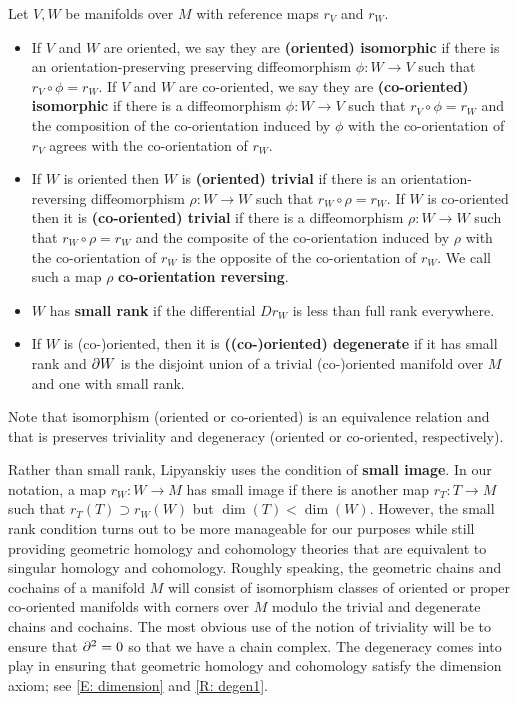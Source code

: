 \begin{definition}\label{D: equiv triv and small}
 Let $V, W$ be manifolds over $M$ with reference maps $r_V$ and $r_W$.
	\begin{itemize}
		\item If $V$ and $W$ are oriented, we say they are \textbf{(oriented) isomorphic} if there is an orientation-preserving preserving diffeomorphism $\phi \colon W \to V$ such that $r_V \circ \phi = r_W$. If $V$ and $W$ are co-oriented, we say they are \textbf{(co-oriented) isomorphic} if there is a diffeomorphism $\phi \colon W \to V$ such that $r_V \circ \phi = r_W$ and the composition of the
co-orientation induced by $\phi$
with the co-orientation of $r_V$ agrees with the co-orientation of $r_W$.

		\item If $W$ is oriented then $W$ is \textbf{(oriented) trivial} if there is an orientation-reversing
 diffeomorphism $\rho \colon W \to W$ such that $r_W \circ \rho = r_W$. If $W$ is co-oriented then it is \textbf{(co-oriented) trivial} if there is a diffeomorphism $\rho \colon W \to W$ such that $r_W \circ \rho = r_W$ and
		the composite of the co-orientation induced by $\rho$ with the co-orientation of $r_W$ is the opposite of the co-orientation of $r_W$. We call such a map $\rho$ \textbf{co-orientation reversing}.

\item $W$ has \textbf{small rank} if the differential $D r_W$ is less than full rank everywhere.
		\item If $W$ is (co-)oriented, then it is \textbf{((co-)oriented) degenerate} if it has small rank and ${\partial W}$ is the disjoint union of a trivial (co-)oriented
		manifold over $M$ and one with small rank.
	\end{itemize}
\end{definition}

Note that isomorphism (oriented or co-oriented) is an equivalence relation and that is preserves triviality and degeneracy (oriented or co-oriented, respectively).

Rather than small rank, Lipyanskiy uses the condition of \textbf{small image}. In our notation, a map $r_W \colon W \to M$ has small image if there is another map $r_T:T \to M$ such that $r_T(T)\supset r_W(W)$ but $\dim(T)<\dim(W)$. However, the small rank condition turns out to be more manageable for our purposes while still providing geometric homology and cohomology theories that are equivalent to singular homology and cohomology. Roughly speaking, the geometric chains and cochains of a manifold $M$ will consist of isomorphism classes of oriented or proper co-oriented manifolds with corners over $M$ modulo the trivial and degenerate chains and cochains. The most obvious use of the notion of triviality will be to ensure that $\partial^2 = 0$ so that we have a chain complex. The degeneracy comes into play in ensuring that geometric homology and cohomology satisfy the dimension axiom; see \cref{E: dimension} and \cref{R: degen1}.

